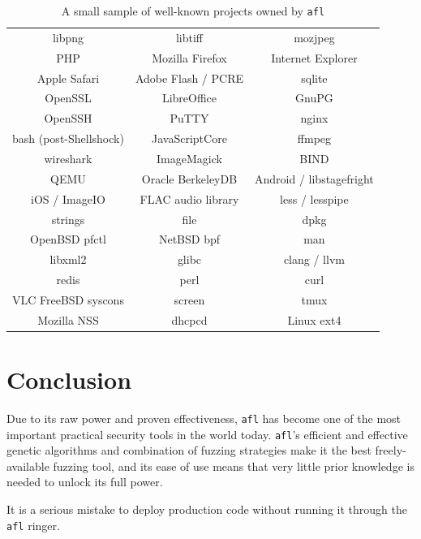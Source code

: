 \begin{table}[H]
\centering
\begin{tabular}{c | c | c}
libpng & libtiff & mozjpeg \\
PHP & Mozilla Firefox & Internet Explorer \\
Apple Safari & Adobe Flash / PCRE & sqlite \\
OpenSSL & LibreOffice & GnuPG \\
OpenSSH & PuTTY & nginx \\
bash (post-Shellshock) & JavaScriptCore & ffmpeg \\
wireshark & ImageMagick & BIND \\
QEMU & Oracle BerkeleyDB & Android / libstagefright \\
iOS / ImageIO & FLAC audio library & less / lesspipe \\
strings & file & dpkg \\
OpenBSD pfctl & NetBSD bpf & man \\
libxml2 & glibc & clang / llvm \\
redis & perl & curl \\
VLC FreeBSD syscons & screen & tmux  \\
Mozilla NSS & dhcpcd & Linux ext4 \\
\end{tabular}
\caption{A small sample of well-known projects owned by \texttt{afl}}
\label{fig:afl-trophies}
\end{table}

\section{Conclusion}

Due to its raw power and proven effectiveness, \texttt{afl} has become one of
the most important practical security tools in the world today. \texttt{afl}'s
efficient and effective genetic algorithms and combination of fuzzing
strategies make it the best freely-available fuzzing tool, and its ease
of use means that very little prior knowledge is needed to unlock its full
power.

It is a serious mistake to deploy production code without running it through
the \texttt{afl} ringer.
